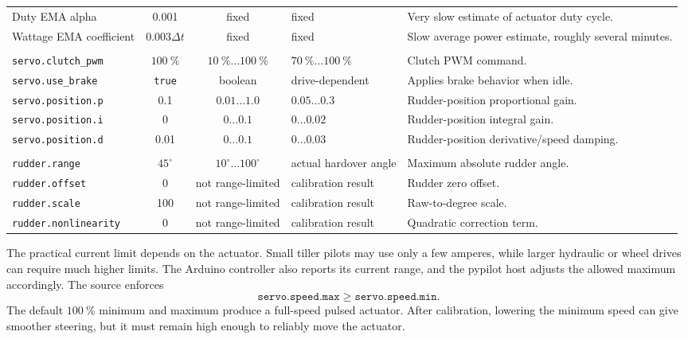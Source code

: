 \documentclass[10pt,twocolumn]{article}
\begin{document}
\begin{table}[!tbp]
\begin{tabularx}{\textwidth}{Z{0.23\textwidth}c c Z{0.16\textwidth}Y}
Duty EMA alpha & \num{0.001} & fixed & fixed & Very slow estimate of actuator duty cycle. \\
Wattage EMA coefficient & \(0.003\Delta t\) & fixed & fixed & Slow average power estimate, roughly several minutes. \\
\addlinespace[0.6ex]
 \\
\addlinespace[0.25ex]
\texttt{servo.clutch\_pwm} & \(\SI{100}{\percent}\) & \(\SI{10}{\percent}\ldots\SI{100}{\percent}\) & \(\SI{70}{\percent}\ldots\SI{100}{\percent}\) & Clutch PWM command. \\
\texttt{servo.use\_brake} & \texttt{true} & boolean & drive-dependent & Applies brake behavior when idle. \\
\texttt{servo.position.p} & \num{0.1} & \(\num{0.01}\ldots\num{1.0}\) & \(\num{0.05}\ldots\num{0.3}\) & Rudder-position proportional gain. \\
\texttt{servo.position.i} & \num{0} & \(\num{0}\ldots\num{0.1}\) & \(\num{0}\ldots\num{0.02}\) & Rudder-position integral gain. \\
\texttt{servo.position.d} & \num{0.01} & \(\num{0}\ldots\num{0.1}\) & \(\num{0}\ldots\num{0.03}\) & Rudder-position derivative/speed damping. \\
\addlinespace[0.6ex]
 \\
\addlinespace[0.25ex]
\texttt{rudder.range} & \(45^\circ\) & \(10^\circ\ldots100^\circ\) & actual hardover angle & Maximum absolute rudder angle. \\
\texttt{rudder.offset} & \num{0} & not range-limited & calibration result & Rudder zero offset. \\
\texttt{rudder.scale} & \num{100} & not range-limited & calibration result & Raw-to-degree scale. \\
\texttt{rudder.nonlinearity} & \num{0} & not range-limited & calibration result & Quadratic correction term. \\
\bottomrule
\end{tabularx}
\end{table}
The practical current limit depends on the actuator.  Small tiller pilots
may use only a few amperes, while larger hydraulic or wheel drives can
require much higher limits.  The Arduino controller also reports its
current range, and the pypilot host adjusts the allowed maximum
accordingly.
The source enforces
\[
\texttt{servo.speed.max}
\ge
\texttt{servo.speed.min}.
\]
The default \(\SI{100}{\percent}\) minimum and maximum produce a
full-speed pulsed actuator.  After calibration, lowering the minimum speed
can give smoother steering, but it must remain high enough to reliably
move the actuator.
\end{document}
